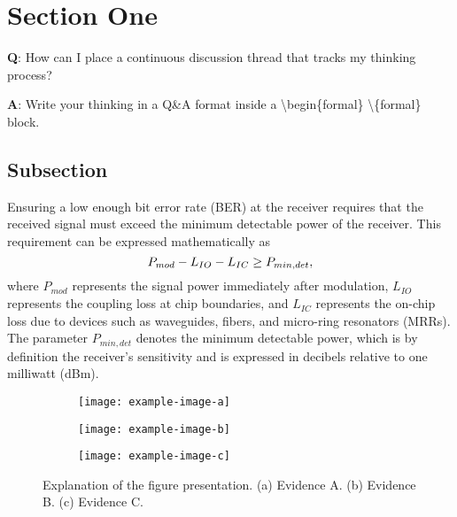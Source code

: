 \documentclass[\projectroot/template.tex]{subfiles}
\begin{document}
\section{Section One}

\blindtext

\begin{formal}
	\textbf{Q}: How can I place a continuous discussion thread that tracks my thinking process?
	
	\noindent\textbf{A}: Write your thinking in a Q\&A format inside a \textbackslash begin\{formal\} \textbackslash\{formal\} block. 
\end{formal}

\subsection{Subsection}

Ensuring a low enough bit error rate (BER) at the receiver requires that the received signal must exceed the minimum detectable power of the receiver. This requirement can be expressed mathematically as
\begin{equation}
	P_{mod}-L_{IO}-L_{IC} \geq P_{min,det}, \tagaddtext{[dBm]}
	\label{eqn:opticalPowerBudget}
\end{equation}
where $P_{mod}$ represents the signal power immediately after modulation, $L_{IO}$ represents the coupling loss at chip boundaries, and $L_{IC}$ represents the on-chip loss due to devices such as waveguides, fibers, and micro-ring resonators (MRRs). The parameter $P_{min,det}$ denotes the minimum detectable power, which is by definition the receiver's sensitivity and is expressed in decibels relative to one milliwatt (dBm).

\begin{figure}[!hbt]
	\centering
	\begin{subfigure}[b]{0.38\textwidth}
		\texttt{[image: example-image-a]}
		\caption{}
		\label{fig:exampleImageA}		%
		\texttt{[image: example-image-b]}
		\caption{}
		\label{fig:exampleImageB}		%
	\end{subfigure}
	\begin{subfigure}[b]{0.6\textwidth}
		\centering
		\texttt{[image: example-image-c]}
		\caption{}
		\label{fig:exampleImageC}		%
	\end{subfigure}
	\caption{Explanation of the figure presentation. (a) Evidence A. (b) Evidence B. (c) Evidence C.}
	\label{fig:exampleImages}		%
\end{figure}
\end{document}
